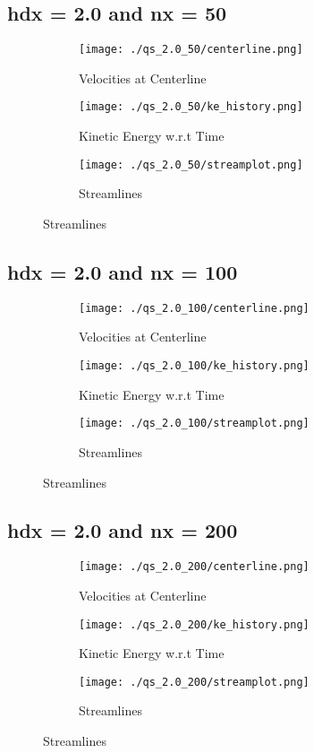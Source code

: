 \documentclass[12pt, a4paper]{report}
\begin{document}
\subsection{hdx = 2.0 and nx = 50}
\begin{figure}[H]
\begin{subfigure}{0.5\textwidth}
	\texttt{[image: ./qs\_2.0\_50/centerline.png]}
	\caption{Velocities at Centerline}
\end{subfigure}
\begin{subfigure}{0.5\textwidth}
	\texttt{[image: ./qs\_2.0\_50/ke\_history.png]}
	\caption{Kinetic Energy w.r.t Time}
\end{subfigure}
\medskip
\begin{subfigure}{\textwidth}
	\centering
	\texttt{[image: ./qs\_2.0\_50/streamplot.png]}
	\caption{Streamlines}
\end{subfigure}
\end{figure}

\subsection{hdx = 2.0 and nx = 100}
\begin{figure}[H]
\begin{subfigure}{0.5\textwidth}
	\texttt{[image: ./qs\_2.0\_100/centerline.png]}
	\caption{Velocities at Centerline}
\end{subfigure}
\begin{subfigure}{0.5\textwidth}
	\texttt{[image: ./qs\_2.0\_100/ke\_history.png]}
	\caption{Kinetic Energy w.r.t Time}
\end{subfigure}
\medskip
\begin{subfigure}{\textwidth}
	\texttt{[image: ./qs\_2.0\_100/streamplot.png]}
	\caption{Streamlines}
\end{subfigure}
\end{figure}

\subsection{hdx = 2.0 and nx = 200}
\begin{figure}[H]
\begin{subfigure}{0.5\textwidth}
	\texttt{[image: ./qs\_2.0\_200/centerline.png]}
	\caption{Velocities at Centerline}
\end{subfigure}
\begin{subfigure}{0.5\textwidth}
	\texttt{[image: ./qs\_2.0\_200/ke\_history.png]}
	\caption{Kinetic Energy w.r.t Time}
\end{subfigure}
\medskip
\begin{subfigure}{\textwidth}
	\texttt{[image: ./qs\_2.0\_200/streamplot.png]}
	\caption{Streamlines}
\end{subfigure}
\end{figure}
\end{document}

